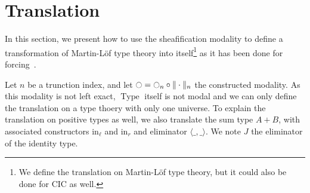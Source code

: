 \documentclass[preprint,9pt,numbers]{sigplanconf}
\DeclareMathOperator{\Type}{Type}
\newcommand{\modal}{\ensuremath{\ocircle}}
\begin{document}
\section{Translation}
\label{sec:translation}

In this section, we present how to use the sheafification modality to
define a transformation of Martin-Löf type theory into
itself\footnote{We define the translation on Martin-Löf type theory,
  but it could also be done for CIC as well.} as it has been done for
forcing~\cite{jaber2012extending}.

Let $n$ be a trunction index, and let $\modal = \modal_n \circ
\|\cdot\|_n$ the constructed modality. 
%
As this modality is not left exact, $\Type$ itself is not modal and we
can only define the translation on a type thoery with only one
universe.
%
To explain the translation on positive types as well, we also
translate the sum type $A+B$, with associated constructors
$\mathrm{in}_\ell$
and $\mathrm{in}_r$ and eliminator $\langle \_ , \_ \rangle$.
%
We note $J$ the eliminator of the identity type. 
%
%
\end{document}
